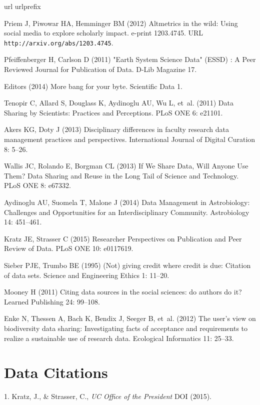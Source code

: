 \documentclass[english]{article}
\begin{document}
\begin{thebibliography}{1}
\expandafter\ifx\csname url\endcsname\relax
  \def\url#1{\texttt{#1}}\fi
\expandafter\ifx\csname urlprefix\endcsname\relax\def\urlprefix{URL }\fi
\providecommand{\bibinfo}[2]{#2}
\providecommand{\eprint}[2][]{\url{#2}}

Priem J, Piwowar HA, Hemminger BM (2012) Altmetrics in the wild: {Using} social
  media to explore scholarly impact.
 e-print 1203.4745.
\newblock \urlprefix\url{http://arxiv.org/abs/1203.4745}.

Pfeiffenberger H, Carlson D (2011) "{Earth} {System} {Science} {Data}" ({ESSD})
  : {A} {Peer} {Reviewed} {Journal} for {Publication} of {Data}.
\newblock D-Lib Magazine 17.

{Editors} (2014) More bang for your byte.
\newblock Scientific Data 1.

Tenopir C, Allard S, Douglass K, Aydinoglu AU, Wu L, et~al. (2011) Data
  {Sharing} by {Scientists}: {Practices} and {Perceptions}.
\newblock PLoS ONE 6: e21101.

Akers KG, Doty J (2013) Disciplinary differences in faculty research data
  management practices and perspectives.
\newblock International Journal of Digital Curation 8: 5--26.

Wallis JC, Rolando E, Borgman CL (2013) If {We} {Share} {Data}, {Will} {Anyone}
  {Use} {Them}? {Data} {Sharing} and {Reuse} in the {Long} {Tail} of {Science}
  and {Technology}.
\newblock PLoS ONE 8: e67332.

Aydinoglu AU, Suomela T, Malone J (2014) Data {Management} in {Astrobiology}:
  {Challenges} and {Opportunities} for an {Interdisciplinary} {Community}.
\newblock Astrobiology 14: 451--461.

Kratz JE, Strasser C (2015) Researcher {Perspectives} on {Publication} and
  {Peer} {Review} of {Data}.
\newblock PLoS ONE 10: e0117619.

Sieber PJE, Trumbo BE (1995) ({Not}) giving credit where credit is due:
  {Citation} of data sets.
\newblock Science and Engineering Ethics 1: 11--20.

Mooney H (2011) Citing data sources in the social sciences: do authors do it?
\newblock Learned Publishing 24: 99--108.

Enke N, Thessen A, Bach K, Bendix J, Seeger B, et~al. (2012) The user's view on
  biodiversity data sharing: {Investigating} facts of acceptance and
  requirements to realize a sustainable use of research data.
\newblock Ecological Informatics 11: 25--33.

\end{thebibliography}

%

\section*{Data Citations}

1. Kratz, J., \& Strasser, C.,  \emph{UC Office of the President} DOI (2015).
\end{document}
